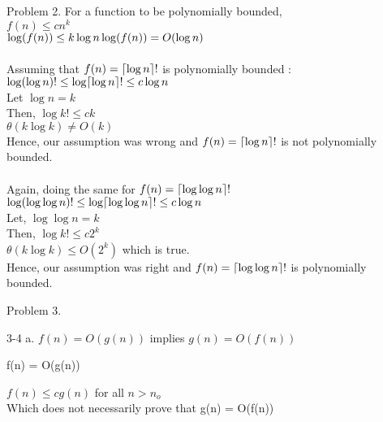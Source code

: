 \documentclass[10pt]{article}
\DeclarePairedDelimiter{\ceil}{\lceil}{\rceil}
\begin{document}
\newpage
\setcounter{equation}{0}
Problem 2.
For a function to be polynomially bounded, \\
$f(n) \leq cn^k$\\
$\log (f(n)) \leq k\log n\\
\log (f(n)) = O(\log n)$\\\\
Assuming that $f(n) = \ceil{\log n}!$ is polynomially bounded : \\
$ \log (\log n)! \leq \log \ceil {\log n}! \leq c\log n $
\\Let $\log n = k$\\
Then, $\log k! \leq ck$\\
$\theta(k\log k) \neq O(k)$
\\Hence, our assumption was wrong and $f(n) = \ceil{\log n}!$ is not polynomially bounded.
\\\\
Again, doing the same for $f(n) = \ceil{\log \log n}!$\\
$ \log (\log \log n)! \leq \log \ceil {\log \log n}! \leq c\log n $
\\Let, $\log \log n = k$\\
Then, $\log k! \leq c2^k$\\
$\theta(k\log k) \leq O(2^k)$ which is true. 
\\Hence, our assumption was right and $f(n) = \ceil{\log \log n}!$ is polynomially bounded.

\newpage
\setcounter{equation}{0}
Problem 3.

3-4 a. $f(n) = O(g(n))$ implies $g(n) = O(f(n))$\\
\begin{center}
f(n) = O(g(n))
\end{center}
$f(n) \leq cg(n)$
for all $n > n_{o}$\\
Which does not necessarily prove that g(n) = O(f(n))
\end{document}
